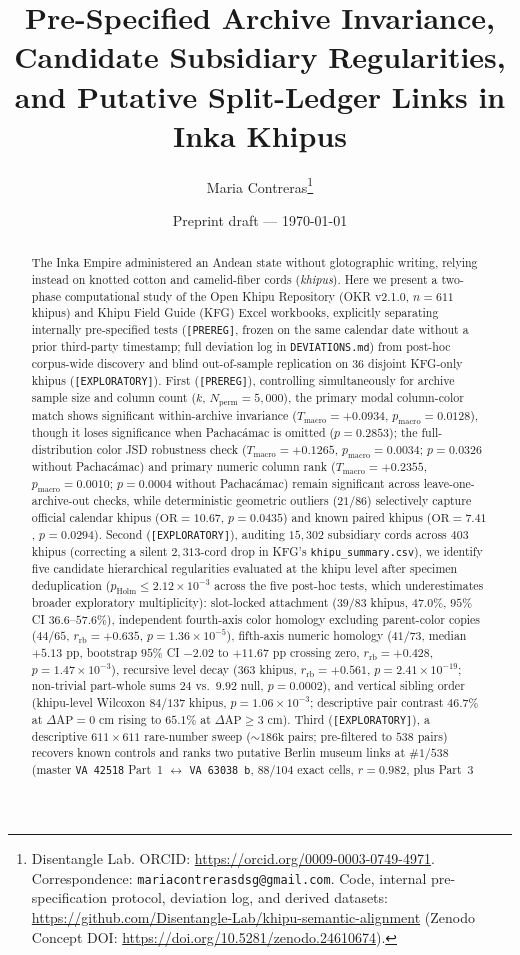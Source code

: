 \documentclass[11pt,a4paper]{article}
\title{\textbf{Pre-Specified Archive Invariance, Candidate Subsidiary Regularities, and Putative Split-Ledger Links in Inka Khipus}}
\author{
  Maria Contreras\thanks{Disentangle Lab. ORCID: \url{https://orcid.org/0009-0003-0749-4971}. Correspondence: \texttt{mariacontrerasdsg@gmail.com}. Code, internal pre-specification protocol, deviation log, and derived datasets: \url{https://github.com/Disentangle-Lab/khipu-semantic-alignment} (Zenodo Concept DOI: \url{https://doi.org/10.5281/zenodo.24610674}).}
}
\date{Preprint draft --- \today}
\begin{document}
\maketitle

\begin{abstract}
The Inka Empire administered an Andean state without glotographic writing, relying instead on knotted cotton and camelid-fiber cords (\emph{khipus}). Here we present a two-phase computational study of the Open Khipu Repository (OKR v2.1.0, $n=611$ khipus) and Khipu Field Guide (KFG) Excel workbooks, explicitly separating internally pre-specified tests (\texttt{[PREREG]}, frozen on the same calendar date without a prior third-party timestamp; full deviation log in \texttt{DEVIATIONS.md}) from post-hoc corpus-wide discovery and blind out-of-sample replication on $36$ disjoint KFG-only khipus (\texttt{[EXPLORATORY]}). First (\texttt{[PREREG]}), controlling simultaneously for archive sample size and column count ($k$, $N_{\mathrm{perm}} = 5{,}000$), the primary modal column-color match shows significant within-archive invariance ($T_{\mathrm{macro}} = +0.0934$, $p_{\mathrm{macro}} = 0.0128$), though it loses significance when Pachac{\'a}mac is omitted ($p = 0.2853$); the full-distribution color JSD robustness check ($T_{\mathrm{macro}} = +0.1265$, $p_{\mathrm{macro}} = 0.0034$; $p = 0.0326$ without Pachac{\'a}mac) and primary numeric column rank ($T_{\mathrm{macro}} = +0.2355$, $p_{\mathrm{macro}} = 0.0010$; $p = 0.0004$ without Pachac{\'a}mac) remain significant across leave-one-archive-out checks, while deterministic geometric outliers ($21/86$) selectively capture official calendar khipus ($\mathrm{OR} = 10.67$, $p = 0.0435$) and known paired khipus ($\mathrm{OR} = 7.41$, $p = 0.0294$). Second (\texttt{[EXPLORATORY]}), auditing $15{,}302$ subsidiary cords across $403$ khipus (correcting a silent $2{,}313$-cord drop in KFG's \texttt{khipu\_summary.csv}), we identify five candidate hierarchical regularities evaluated at the khipu level after specimen deduplication ($p_{\mathrm{Holm}} \le 2.12 \times 10^{-3}$ across the five post-hoc tests, which underestimates broader exploratory multiplicity): slot-locked attachment ($39/83$ khipus, $47.0\%$, $95\%$ CI $36.6\text{--}57.6\%$), independent fourth-axis color homology excluding parent-color copies ($44/65$, $r_{\mathrm{rb}} = +0.635$, $p = 1.36 \times 10^{-5}$), fifth-axis numeric homology ($41/73$, median $+5.13\text{ pp}$, bootstrap $95\%$ CI $-2.02$ to $+11.67\text{ pp}$ crossing zero, $r_{\mathrm{rb}} = +0.428$, $p = 1.47 \times 10^{-3}$), recursive level decay ($363$ khipus, $r_{\mathrm{rb}} = +0.561$, $p = 2.41 \times 10^{-19}$; non-trivial part-whole sums $24$ vs.\ $9.92$ null, $p = 0.0002$), and vertical sibling order (khipu-level Wilcoxon $84/137$ khipus, $p = 1.06 \times 10^{-3}$; descriptive pair contrast $46.7\%$ at $\Delta\text{AP}=0\text{ cm}$ rising to $65.1\%$ at $\Delta\text{AP}\ge 3\text{ cm}$). Third (\texttt{[EXPLORATORY]}), a descriptive $611 \times 611$ rare-number sweep ($\sim 186\text{k}$ pairs; pre-filtered to $538$ pairs) recovers known controls and ranks two putative Berlin museum links at $\#1/538$ (master \texttt{VA 42518} Part~1 $\leftrightarrow$ \texttt{VA 63038 b}, $88/104$ exact cells, $r = 0.982$, plus Part~3 
\end{abstract}
\end{document}
